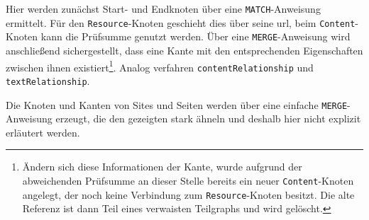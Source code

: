     Hier werden zunächst Start- und Endknoten über eine \texttt{MATCH}-Anweisung ermittelt.
    Für den \texttt{Resource}-Knoten geschieht dies über seine \gls{url},
    beim \texttt{Content}-Knoten kann die Prüfsumme genutzt werden.
    Über eine \texttt{MERGE}-Anweisung wird anschließend sichergestellt,
    dass eine Kante mit den entsprechenden Eigenschaften zwischen ihnen
    existiert\footnote{Ändern sich diese Informationen der Kante, wurde aufgrund der abweichenden
    Prüfsumme an dieser Stelle bereits ein neuer \texttt{Content}-Knoten angelegt,
    der noch keine Verbindung zum \texttt{Resource}-Knoten besitzt.
    Die alte Referenz ist dann Teil eines verwaisten Teilgraphs und wird gelöscht.}.
    Analog verfahren \texttt{contentRelationship} und \texttt{textRelationship}.

    Die Knoten und Kanten von Sites und Seiten werden über eine einfache \texttt{MERGE}-Anweisung erzeugt,
    die den gezeigten stark ähneln und deshalb hier nicht explizit erläutert werden.
